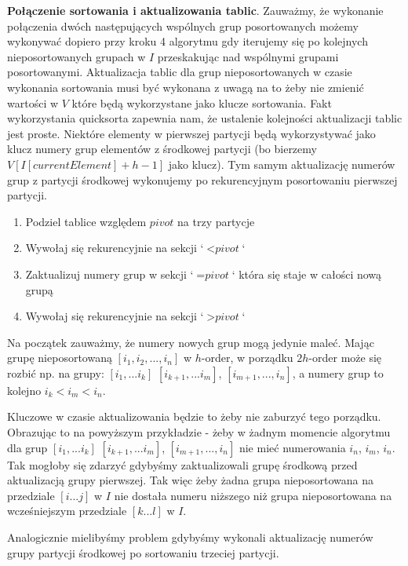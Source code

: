 \documentclass[12pt]{article}
\begin{document}
\textbf{Połączenie sortowania i aktualizowania tablic}. Zauważmy, że wykonanie połączenia dwóch następujących wspólnych grup posortowanych możemy wykonywać dopiero przy kroku 4 algorytmu gdy iterujemy się po kolejnych nieposortowanych grupach w $I$ przeskakując nad wspólnymi grupami posortowanymi. Aktualizacja tablic dla grup nieposortowanych w czasie wykonania sortowania musi być wykonana z uwagą na to żeby nie zmienić wartości w $V$ które będą wykorzystane jako klucze sortowania. Fakt wykorzystania quicksorta zapewnia nam, że ustalenie kolejności aktualizacji tablic jest proste. Niektóre elementy w pierwszej partycji będą wykorzystywać jako klucz numery grup elementów z środkowej partycji (bo bierzemy $V[I[currentElement] + h - 1]$ jako klucz). Tym samym aktualizację numerów grup z partycji środkowej wykonujemy po rekurencyjnym posortowaniu pierwszej partycji.
\begin{enumerate}
    \item Podziel tablice względem $pivot$ na trzy partycje
    \item Wywołaj się rekurencyjnie na sekcji `$< \textit{pivot}$`
    \item Zaktualizuj numery grup w sekcji `$= \textit{pivot}$` która się staje w całości nową grupą
    \item Wywołaj się rekurencyjnie na sekcji `$> \textit{pivot}$`
\end{enumerate}
\medskip

Na początek zauważmy, że numery nowych grup mogą jedynie maleć. Mając grupę nieposortowaną $[i_1, i_2, ..., i_n]$ w $h$-order, w porządku $2h$-order może się rozbić np. na grupy: $[i_1, ... i_k]$ $[i_{k+1}, ... i_m]$, $[i_{m+1}, ..., i_n]$, a numery grup to kolejno $i_k < i_m < i_n$.

Kluczowe w czasie aktualizowania będzie to żeby nie zaburzyć tego porządku. Obrazując to na powyższym przykładzie - żeby w żadnym momencie algorytmu dla grup $[i_1, ... i_k]$ $[i_{k+1}, ... i_m]$, $[i_{m+1}, ..., i_n]$ nie mieć numerowania $i_n$, $i_m$, $i_n$. Tak mogłoby się zdarzyć gdybyśmy zaktualizowali grupę środkową przed aktualizacją grupy pierwszej. Tak więc żeby żadna grupa nieposortowana na przedziale $[i ... j]$ w $I$ nie dostała numeru niższego niż grupa nieposortowana na wcześniejszym przedziale $[k ... l]$ w $I$.

Analogicznie mielibyśmy problem gdybyśmy wykonali aktualizację numerów grupy partycji środkowej po sortowaniu trzeciej partycji.


\printbibliography[title={Bibliografia}]
\end{document}
